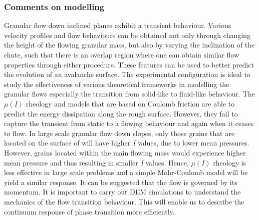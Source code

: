 \subsubsection{Comments on modelling}

Granular flow down inclined planes exhibit a transient behaviour. Various 
velocity profiles and flow behaviours can be obtained not only through changing 
the height of the flowing granular mass, but also by varying the inclination of 
the chute, such that there is an overlap region where one can obtain similar 
flow properties through either procedure. These features can be used to better 
predict the evolution of an avalanche surface. The experimental configuration 
is ideal to study the effectiveness of various theoretical frameworks in 
modelling the granular flows especially the transition from solid-like to 
fluid-like behaviour. The $\mu(I)$ rheology and models 
that are based on Coulomb friction are able to predict the energy dissipation 
along the rough surface. However, they fail to capture the transient from 
static to a flowing behaviour and again when it ceases to flow. 
In large scale granular flow down slopes, only those grains that are
located on the surface of will have higher \textit{I} values, due to lower 
mean pressures. However, grains located within the main flowing mass would 
experience higher mean pressure and thus resulting in smaller \textit{I} 
values. Hence, $\mu(I)$ rheology is less effective in large scale problems and 
a simple Mohr-Coulomb model will be yield a similar response. It can be 
suggested that the flow is governed by its momentum. It is 
important to carry out DEM simulations to understand the mechanics of the flow 
transition behaviour. This will enable us to describe the continuum response of 
phase transition more efficiently.


